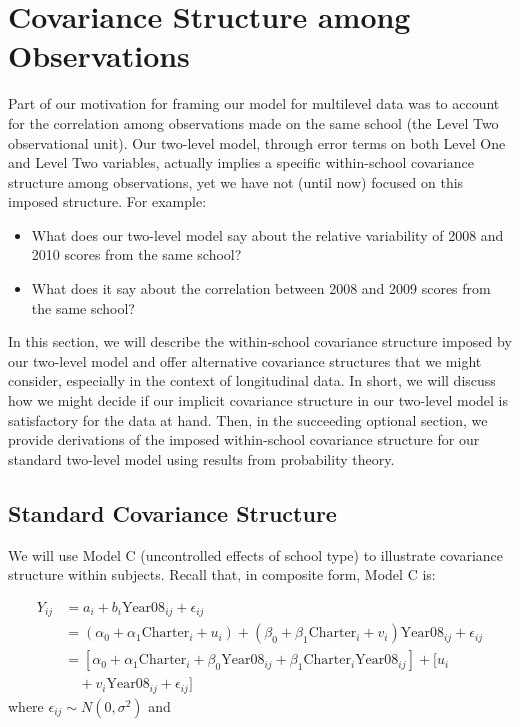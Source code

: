 \documentclass[
]{krantz}
\providecommand{\tightlist}{%
  \setlength{\itemsep}{0pt}\setlength{\parskip}{0pt}}
\begin{document}
\hypertarget{errorcovariance}{%
\section{Covariance Structure among Observations}\label{errorcovariance}}

Part of our motivation for framing our model for multilevel data was to account for the correlation among observations made on the same school (the Level Two observational unit). Our two-level model, through error terms on both Level One and Level Two variables, actually implies a specific within-school covariance structure  among observations, yet we have not (until now) focused on this imposed structure. For example:

\begin{itemize}
\tightlist
\item
  What does our two-level model say about the relative variability of 2008 and 2010 scores from the same school?
\item
  What does it say about the correlation between 2008 and 2009 scores from the same school?
\end{itemize}

In this section, we will describe the within-school covariance structure imposed by our two-level model and offer alternative covariance structures that we might consider, especially in the context of longitudinal data. In short, we will discuss how we might decide if our implicit covariance structure in our two-level model is satisfactory for the data at hand. Then, in the succeeding optional section, we provide derivations of the imposed within-school covariance structure for our standard two-level model using results from probability theory.

\hypertarget{standarderror}{%
\subsection{Standard Covariance Structure}\label{standarderror}}

We will use Model C (uncontrolled effects of school type) to illustrate covariance structure within subjects. Recall that, in composite form, Model C is:

\begin{align*}
Y_{ij} & = a_{i}+b_{i}\textrm{Year08}_{ij}+ \epsilon_{ij} \\
       & = (\alpha_{0}+ \alpha_{1}\textrm{Charter}_i + u_{i}) + (\beta_{0}+\beta_{1}\textrm{Charter}_i +v_{i}) \textrm{Year08}_{ij} + \epsilon_{ij} \\
       & = [\alpha_{0}+\alpha_{1}\textrm{Charter}_i + \beta_{0}\textrm{Year08}_{ij} + \beta_{1}\textrm{Charter}_i\textrm{Year08}_{ij}] + [u_{i} \\
       & \quad + v_{i}\textrm{Year08}_{ij} + \epsilon_{ij}]
\end{align*}
\noindent where \(\epsilon_{ij}\sim N(0,\sigma^2)\) and
\end{document}
